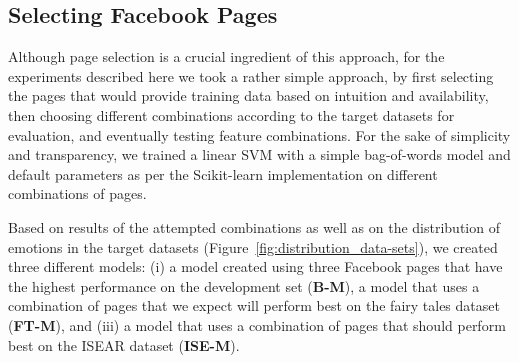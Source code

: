 \documentclass[11pt]{article}
\begin{document}


\subsection{Selecting Facebook Pages}
\label{sec:selecting}

Although page selection is a crucial ingredient of this approach, for the experiments described here we took a rather simple approach, by first selecting the pages that would provide training data based on intuition and availability, then choosing different combinations according to the target datasets for evaluation, and eventually testing feature combinations. 
For the sake of simplicity and transparency, we trained a linear SVM with a simple bag-of-words model and default parameters as per the Scikit-learn implementation \cite{scikit-learn} on different combinations of pages. 

%



Based on results of the attempted combinations as well as on the distribution of emotions in the target datasets (Figure~\ref{fig:distribution_data-sets}), we created three different models: (i) a model created using three Facebook pages that have the highest performance on the development set (\textbf{B-M}), a model that uses a combination of pages that we expect will perform best on the fairy tales dataset (\textbf{FT-M}), and (iii) a model that uses a combination of pages that should perform best on the ISEAR dataset (\textbf{ISE-M}).
\end{document}

